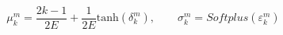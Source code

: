 \begin{equation}
\label{eq:gaussian-centers-widths}
{\mu }_{k}^{m}=\frac{2k-1}{2E}+\frac{1}{2E}\mathrm{tanh}\left( {\delta }_{k}^{m}\right) ,\quad \quad {\sigma }_{k}^{m}=Softplus\left( {\varepsilon }_{k}^{m}\right) 
\end{equation}
